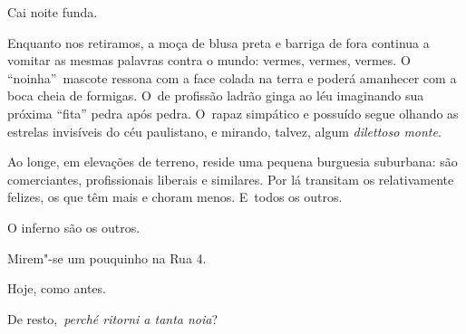  

Cai noite funda.

Enquanto nos retiramos, a moça de blusa preta e barriga de fora continua
a vomitar as mesmas palavras contra o mundo: vermes, vermes, vermes. O
``noinha''~mascote ressona com a face colada na terra e poderá amanhecer
com a boca cheia de formigas. O~de profissão ladrão ginga ao léu
imaginando sua próxima ``fita'' pedra após pedra. O~rapaz simpático e
possuído segue olhando as estrelas invisíveis do céu paulistano, e
mirando, talvez, algum \emph{dilettoso monte}.

Ao longe, em elevações de terreno, reside uma pequena burguesia
suburbana: são comerciantes, profissionais liberais e similares. Por lá
transitam os relativamente felizes, os que têm mais e choram menos. E~todos os outros.

O inferno são os outros.

 

Mirem"-se um pouquinho na Rua 4.

Hoje, como antes.

De resto,~\emph{perché ritorni a tanta noia}?

